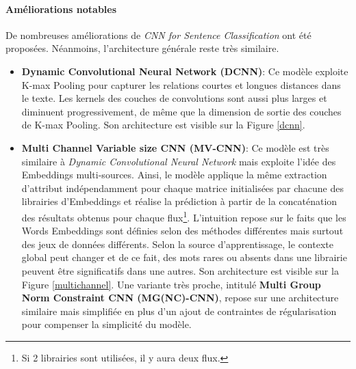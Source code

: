 \paragraph{Améliorations notables}
De nombreuses améliorations de \textit{CNN for Sentence Classification} ont été proposées. Néanmoins, l'architecture générale reste très similaire.
\begin{itemize}
    \item \textbf{Dynamic Convolutional Neural Network (DCNN)}\cite{dcnn}: Ce modèle exploite K-max Pooling pour capturer les relations courtes et longues distances dans le texte. Les kernels des couches de convolutions sont aussi plus larges et diminuent progressivement, de même que la dimension de sortie des couches de K-max Pooling. Son architecture est visible sur la Figure \ref{dcnn}.

    \item \textbf{Multi Channel Variable size CNN (MV-CNN)}\cite{multichannel}: Ce modèle est très similaire à \textit{Dynamic Convolutional Neural Network} mais exploite l'idée des Embeddings multi-sources. Ainsi, le modèle applique la même extraction d'attribut indépendamment pour chaque matrice initialisées par chacune des librairies d'Embeddings et réalise la prédiction à partir de la concaténation des résultats obtenus pour chaque flux\footnote{Si 2 librairies sont utilisées, il y aura deux flux.}. L'intuition repose sur le faits que les Words Embeddings sont définies selon des méthodes différentes mais surtout des jeux de données différents. Selon la source d'apprentissage, le contexte global peut changer et de ce fait, des mots rares ou absents dans une librairie peuvent être significatifs dans une autres. Son architecture est visible sur la Figure \ref{multichannel}. Une variante très proche, intitulé \textbf{Multi Group Norm Constraint CNN (MG(NC)-CNN)}\cite{multinorm}, repose sur une architecture similaire mais simplifiée en plus d'un ajout de contraintes de régularisation pour compenser la simplicité du modèle.

\end{itemize}

